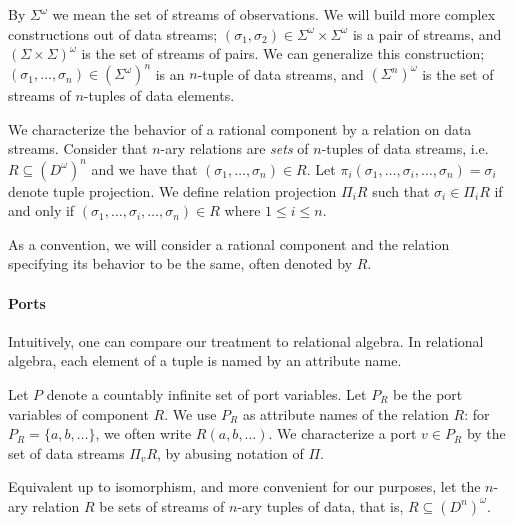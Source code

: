 \medskip

By $\Sigma^{\omega}$ we mean the set of streams of observations.
We will build more complex constructions out of data streams;
$(\sigma_1,\sigma_2)\in \Sigma^\omega\times \Sigma^\omega$ is a pair of streams,
and $(\Sigma\times \Sigma)^\omega$ is the set of streams of pairs.
We can generalize this construction;
$(\sigma_1,\ldots,\sigma_n)\in(\Sigma^\omega)^n$ is an $n$-tuple of data streams,
and $(\Sigma^n)^\omega$ is the set of streams of $n$-tuples of data elements.

We characterize the behavior of a rational component by a relation on data streams.
Consider that $n$-ary relations are \emph{sets} of $n$-tuples of data streams,
i.e. $R\subseteq (D^\omega)^n$ and we have that $(\sigma_{1},\ldots,\sigma_{n})\in R$.
Let $\pi_i(\sigma_{1},\ldots,\sigma_{i},\ldots,\sigma_{n})=\sigma_{i}$ denote tuple projection.
We define relation projection $\Pi_i R$ such that $\sigma_i\in\Pi_i R$ if and only if $(\sigma_{1},\ldots,\sigma_i,\ldots,\sigma_{n})\in R$ where $1\leq i\leq n$.

As a convention, we will consider a rational component and the relation specifying its behavior
to be the same, often denoted by $R$.

\paragraph{Ports}
Intuitively, one can compare our treatment to relational algebra.
In relational algebra, each element of a tuple is named by an attribute name.

Let $P$ denote a countably infinite set of port variables.
Let $P_R$ be the port variables of component $R$.
We use $P_R$ as attribute names of the relation $R$: for $P_R=\{a,b,\ldots\}$, we often write $R(a,b,\ldots)$. We characterize a port $v\in P_R$ by the set of data streams $\Pi_v R$, by abusing notation of $\Pi$.

Equivalent up to isomorphism, and more convenient for our purposes,
let the $n$-ary relation $R$ be sets of streams of $n$-ary tuples of data,
that is, $R\subseteq (D^n)^\omega$.

